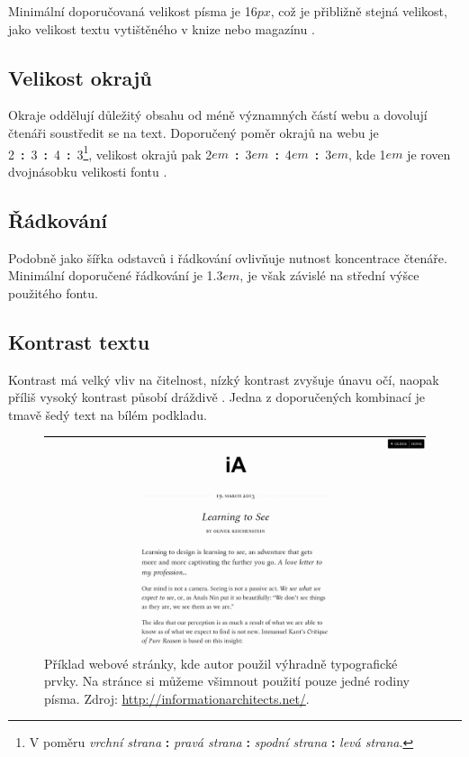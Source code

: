 Minimální doporučovaná velikost písma je 16$px$, což je přibližně stejná velikost, jako velikost textu vytištěného v knize nebo magazínu \cite{13} \cite{10}.

\subsection{Velikost okrajů}

Okraje oddělují důležitý obsahu od méně významných částí webu a dovolují čtenáři soustředit se na text. Doporučený poměr okrajů na webu je 2~\textbf{:}~3~\textbf{:}~4~\textbf{:}~3\footnote{V poměru \textit{vrchní strana} \textbf{:} \textit{pravá strana} \textbf{:} \textit{spodní strana} \textbf{:} \textit{levá strana}.}, velikost okrajů pak 2$em$~\textbf{:}~3$em$~\textbf{:}~4$em$~\textbf{:}~3$em$, kde 1$em$ je roven dvojnásobku velikosti fontu \cite{10}.

\subsection{Řádkování}

Podobně jako šířka odstavců i řádkování ovlivňuje nutnost koncentrace čtenáře. Minimální doporučené řádkování je 1.3$em$, je však závislé na střední výšce použitého fontu.

\subsection{Kontrast textu}

Kontrast má velký vliv na čitelnost, nízký kontrast zvyšuje únavu očí, naopak příliš vysoký kontrast působí dráždivě \cite{11}. Jedna z doporučených kombinací je tmavě šedý text na bílém podkladu.

\begin{figure}[htbp]
    \centering
    \includegraphics[width=\textwidth]{images/typography.png}
    \caption{Příklad webové stránky, kde autor použil výhradně typografické prvky. Na stránce si můžeme všimnout použití pouze jedné rodiny písma. Zdroj: \url{http://informationarchitects.net/}.}
    \label{fig:web-typography}
\end{figure}
